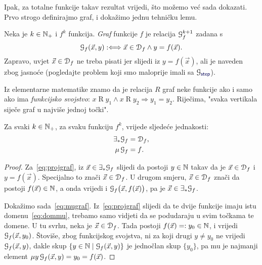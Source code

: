 Ipak, za totalne funkcije takav rezultat vrijedi, što možemo već sada dokazati. Prvo strogo definirajmo graf, i dokažimo jednu tehničku lemu.

\begin{definicija}
Neka je $k\in{\mathbb N}_+$ i $f^k$ funkcija. \emph{Graf} funkcije $f$ je relacija $\mathcal G_{f}^{k+1}$ zadana s
\begin{equation}
    \label{eq:defgraf}\mathcal G_{f}(\vec x,y):\Longleftrightarrow\vec x\in\mathcal D_{f}\land y=f(\vec x)\text.
\end{equation}
Zapravo, uvjet $\vec x\in\mathcal D_{f}$ ne treba pisati jer slijedi iz $y=f(\vec x)$, ali je naveden zbog jasnoće (pogledajte problem koji smo maloprije imali sa $\graf{\f{step}}$).
\end{definicija}

\begin{napomena}\label{nap:graf=funsv}
Iz elementarne matematike znamo da je relacija $R$ graf neke funkcije ako i samo ako ima \emph{funkcijsko svojstvo}: $x\mathrel R y_1\land x\mathrel R y_2\Rightarrow y_1=y_2$. Riječima, "svaka vertikala siječe graf u najviše jednoj točki".
\end{napomena}

\begin{lema}\label{lm:projmugraf}
Za svaki $k\in{\mathbb N}_+$, za svaku funkciju $f^k$, vrijede sljedeće jednakosti:
\begin{align}
    \label{eq:projgraf}\exists_*\mathcal G_{f}&=\mathcal D_{f}\text,\\
    \label{eq:mugraf}\mu\,\mathcal G_{f}&=f\text.
\end{align}
\end{lema}
\begin{proof}
Za~\eqref{eq:projgraf}, iz $\vec x\in\exists_*\mathcal G_{f}$ slijedi da postoji $y\in{\mathbb N}$ takav da je $\vec x\in\mathcal D_{f}$ i $y=f(\vec x)$. Specijalno to znači $\vec x\in\mathcal D_{f}$. U drugom smjeru, $\vec x\in\mathcal D_{f}$ znači da postoji $f(\vec x)\in{\mathbb N}$, a onda vrijedi i $\mathcal G_{f}\bigl(\vec x,f(\vec x)\bigr)$, pa je $\vec x\in\exists_*\mathcal G_{f}$.

Dokažimo sada~\eqref{eq:mugraf}. Iz~\eqref{eq:projgraf} slijedi da te dvije funkcije imaju istu domenu~\eqref{eq:dommu}, trebamo samo vidjeti da se podudaraju u svim točkama te domene. U tu svrhu, neka je $\vec x\in\mathcal D_{f}$. Tada postoji $f(\vec x)=:y_0\in{\mathbb N}$, i vrijedi $\mathcal G_{f}(\vec x,y_0)$. Štoviše, zbog funkcijskog svojstva, ni za koji drugi $y\not=y_0$ ne vrijedi $\mathcal G_{f}(\vec x,y)$, dakle skup $\{y\in{\mathbb N}\mid\mathcal G_{f}(\vec x,y)\}$ je jednočlan skup $\{y_0\}$, pa mu je najmanji element $\mu y\,\mathcal G_{f}(\vec x,y)=y_0=f(\vec x)$.
\end{proof}

